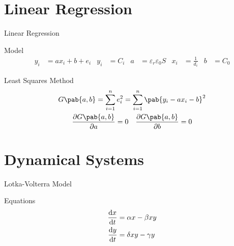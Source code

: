 \documentclass[xcolor]{beamer}
\newcommand{\inv}[1]{\frac{1}{#1}}
\begin{document}
\section{Linear Regression}
\begin{frame}{Linear Regression}
\begin{block}{Model}
\begin{align*}
y_{i} &= a x_{i} + b + e_{i} & y_{i} &= C_{i} & a &= \varepsilon_{r}\varepsilon_{0}S & x_{i} &= \inv{d_{i}} & b &= C_{0}
\end{align*}
\end{block}
\begin{block}{Least Squares Method}
\begin{gather*}
G\pab{a,b} = \sum_{i=1}^{n}e_{i}^{2} = \sum_{i=1}^{n}\pab{y_{i} - a x_{i} - b}^{2} \\
\pdv{G\pab{a,b}}{a} = 0 \quad \pdv{G\pab{a,b}}{b} = 0
\end{gather*}
\end{block}
\end{frame}

\section{Dynamical Systems}
\begin{frame}{Lotka-Volterra Model}
\begin{block}{Equations}
\begin{align*}
\odv{x}{t} &= \alpha x - \beta x y \\
\odv{y}{t} &= \delta x y - \gamma y
\end{align*}
\end{block}
\end{frame}
\end{document}
